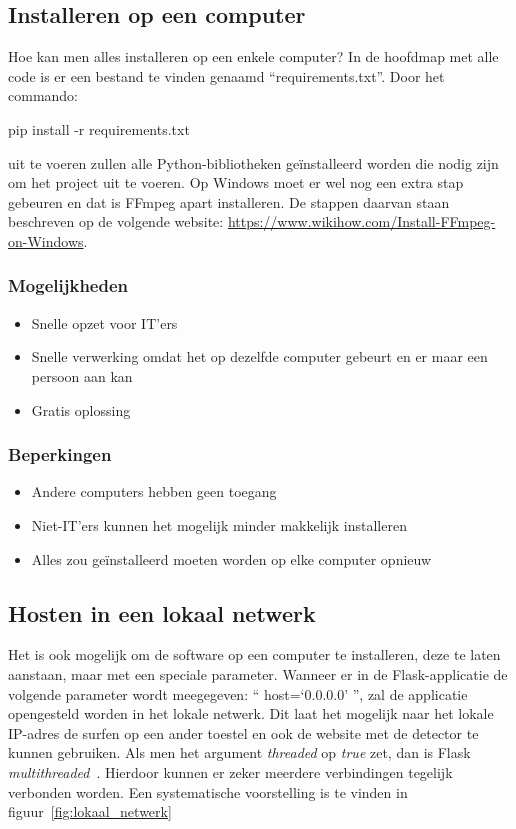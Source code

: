 \subsection{Installeren op een computer}
Hoe kan men alles installeren op een enkele computer?
In de hoofdmap met alle code is er een bestand te vinden genaamd ``requirements.txt''. Door het commando:
\begin{python}
    pip install -r requirements.txt
\end{python}
uit te voeren zullen alle Python-bibliotheken geïnstalleerd worden die nodig zijn om het project uit te voeren. Op Windows moet er wel nog een extra stap gebeuren en dat is FFmpeg apart installeren. De stappen daarvan staan beschreven op de volgende website: \url{https://www.wikihow.com/Install-FFmpeg-on-Windows}.

\subsubsection{Mogelijkheden}
\begin{itemize}
    \item Snelle opzet voor IT'ers
    \item Snelle verwerking omdat het op dezelfde computer gebeurt en er maar een persoon aan kan
    \item Gratis oplossing
\end{itemize}
\subsubsection{Beperkingen}
\begin{itemize}
    \item Andere computers hebben geen toegang
    \item Niet-IT'ers kunnen het mogelijk minder makkelijk installeren
    \item Alles zou geïnstalleerd moeten worden op elke computer opnieuw
\end{itemize}

\subsection{Hosten in een lokaal netwerk}
Het is ook mogelijk om de software op een computer te installeren, deze te laten aanstaan, maar met een speciale parameter. Wanneer er in de Flask-applicatie de volgende parameter wordt meegegeven: `` host=`0.0.0.0' '', zal de applicatie opengesteld worden in het lokale netwerk. Dit laat het mogelijk naar het lokale IP-adres de surfen op een ander toestel en ook de website met de detector te kunnen gebruiken. Als men het argument \textit{threaded} op \textit{true} zet, dan is Flask \textit{multithreaded}~\autocite{Vieira2013}. Hierdoor kunnen er zeker meerdere verbindingen tegelijk verbonden worden. Een systematische voorstelling is te vinden in figuur~\ref{fig:lokaal_netwerk}

